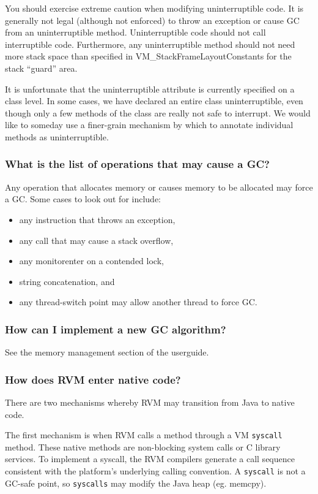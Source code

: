 You should exercise extreme caution when modifying uninterruptible code.  It
is generally not legal (although not enforced) to throw an exception or 
cause GC from an uninterruptible method.  Uninterruptible code should not
call interruptible code. Furthermore, any uninterruptible method should
not need more stack space than specified in VM\_StackFrameLayoutConstants
for the stack ``guard'' area.

It is unfortunate that the uninterruptible attribute is currently
specified on a class level.  In some cases, we have declared an entire
class uninterruptible, even though only a few methods of the class are
really not safe to interrupt.  We would like to someday use a finer-grain
mechanism by which to annotate individual methods as uninterruptible.

\subsubsection{What is the list of operations that may cause a GC?}

Any operation that allocates memory or causes memory to be allocated may
force a GC.  Some cases to look out for include:
\begin{itemize}
\item any instruction that throws an exception,
\item any call that may cause a stack overflow,
\item any monitorenter on a contended lock,
\item string concatenation, and
\item any thread-switch point may allow another thread to force GC.
\end{itemize}

\subsubsection{How can I implement a new GC algorithm?}

See the memory management section of the userguide.

\subsubsection{How does RVM enter native code?}

There are two mechanisms whereby RVM may transition from Java to native
code.

The first mechanism is when RVM calls a method through a VM {\tt syscall}
method.  These native methods are non-blocking system calls or C library 
services.  To implement a syscall, the RVM compilers generate a call
sequence consistent with the platform's underlying calling convention.
A {\tt syscall} is not a GC-safe point, so {\tt syscalls} may modify the
Java heap (eg. memcpy).


